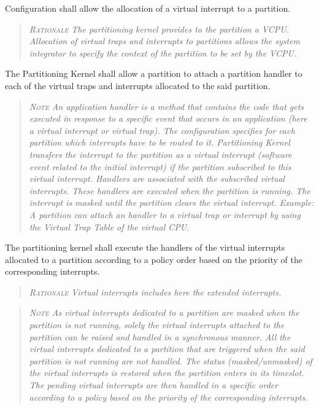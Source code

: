 Configuration shall allow the allocation of a virtual interrupt to a partition.
\begin{quote}\it
\textsc{Rationale}
The partitioning kernel provides to the partition a VCPU. Allocation of virtual traps and interrupts to partitions allows the system integrator to specify the context of the partition to be set by the VCPU.
\end{quote}

The Partitioning Kernel shall allow a partition to attach a partition handler to each of the virtual traps and interrupts allocated to the said partition.
\begin{quote}\it
\textsc{Note}
An application handler is a method that contains the code that gets executed in response to a specific event that occurs in an application (here a virtual interrupt or virtual trap).
The configuration specifies for each partition which interrupts have to be routed to it. Partitioning Kernel transfers the interrupt to the partition as a virtual interrupt (software event related to the initial interrupt) if the partition subscribed to this virtual interrupt.  Handlers are associated with the subscribed virtual interrupts. These handlers are executed when the partition is running.  The interrupt is masked until the partition clears the virtual interrupt.
Example: A partition can attach an handler to a virtual trap or interrupt by using the Virtual Trap Table of the virtual CPU.
\end{quote}

The partitioning kernel shall execute the handlers of the virtual interrupts allocated to a partition according to a policy order based on the priority of the corresponding interrupts.
\begin{quote}\it
\textsc{Rationale}
Virtual interrupts includes here the extended interrupts.
\end{quote}
\begin{quote}\it
\textsc{Note}
As virtual interrupts dedicated to a partition are masked when the partition is not running, solely the virtual interrupts attached to the partition can be raised and handled in a synchronous manner. All the virtual interrupts dedicated to a partition that are triggered when the said partition is not running are not handled. The status (masked/unmasked) of the virtual interrupts is restored when the partition enters in its timeslot. The pending virtual interrupts are then handled in a specific order according to a policy based on the priority of the corresponding interrupts.
\end{quote}

